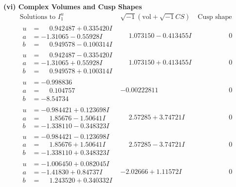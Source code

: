 \documentclass[1p]{elsarticle_modified}
\theoremstyle{definition}
\newcommand{\I}{\sqrt{-1}}
\begin{document}
\newpage\flushleft \textbf{(vi) Complex Volumes and Cusp Shapes}
$$\begin{array}{c|c|c}  
\text{Solutions to }I^u_{1}& \I (\text{vol} + \sqrt{-1}CS) & \text{Cusp shape}\\
 \hline 
\begin{aligned}
u &= \phantom{-}0.942487 + 0.335420 I \\
a &= -1.31065 - 0.55928 I \\
b &= \phantom{-}0.949578 - 0.100314 I\end{aligned}
 & \phantom{-}1.073150 - 0.413455 I & \phantom{-0.000000 } 0 \\ \hline\begin{aligned}
u &= \phantom{-}0.942487 - 0.335420 I \\
a &= -1.31065 + 0.55928 I \\
b &= \phantom{-}0.949578 + 0.100314 I\end{aligned}
 & \phantom{-}1.073150 + 0.413455 I & \phantom{-0.000000 } 0 \\ \hline\begin{aligned}
u &= -0.998836\phantom{ +0.000000I} \\
a &= \phantom{-}0.104757\phantom{ +0.000000I} \\
b &= -8.54734\phantom{ +0.000000I}\end{aligned}
 & -0.00222811\phantom{ +0.000000I} & \phantom{-0.000000 } 0 \\ \hline\begin{aligned}
u &= -0.984421 + 0.123698 I \\
a &= \phantom{-}1.85676 - 1.50641 I \\
b &= -1.338110 - 0.348323 I\end{aligned}
 & \phantom{-}2.57285 + 3.74721 I & \phantom{-0.000000 } 0 \\ \hline\begin{aligned}
u &= -0.984421 - 0.123698 I \\
a &= \phantom{-}1.85676 + 1.50641 I \\
b &= -1.338110 + 0.348323 I\end{aligned}
 & \phantom{-}2.57285 - 3.74721 I & \phantom{-0.000000 } 0 \\ \hline\begin{aligned}
u &= -1.006450 + 0.082045 I \\
a &= -1.41830 + 0.84737 I \\
b &= \phantom{-}1.243520 + 0.340332 I\end{aligned}
 & -2.02666 + 1.11572 I & \phantom{-0.000000 } 0 \\ \hline\begin{aligned}

\end{aligned}
\end{array}$$
\end{document}

